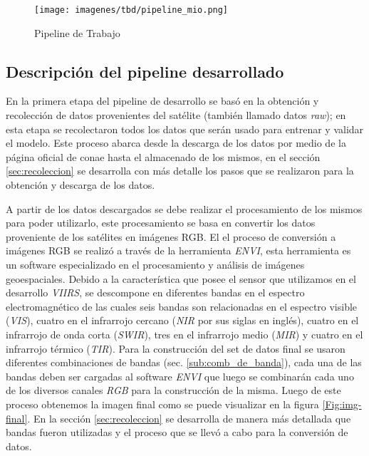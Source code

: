 \begin{figure}[H] \centering
  \texttt{[image: imagenes/tbd/pipeline\_mio.png]}
  \caption{Pipeline de Trabajo}\label{Fig:pipeline-mio}
\end{figure}

\newpage
\subsection*{Descripción del pipeline desarrollado}\label{sub:desc-pipeline}

En la primera etapa del pipeline de desarrollo se basó en la obtención y recolección de datos provenientes del satélite (también llamado datos \textit{raw}); en esta etapa se recolectaron todos los datos que serán usado para entrenar y validar el modelo. Este proceso abarca desde la descarga de los datos por medio de la página oficial de \ac{conae} hasta el almacenado de los mismos, en el sección \ref{sec:recoleccion} se desarrolla con más detalle los pasos que se realizaron para la obtención y descarga de los datos.

A partir de los datos descargados  se debe realizar el procesamiento de los mismos para poder utilizarlo, este procesamiento se basa en convertir los datos proveniente de los satélites en imágenes RGB. El el proceso de conversión a imágenes RGB se realizó a través de la herramienta \textit{ENVI}, esta herramienta es un software  especializado en el procesamiento y análisis de imágenes  geoespaciales. Debido a la característica que posee el sensor que utilizamos en el desarrollo \textit{VIIRS}, se descompone en diferentes bandas en el espectro electromagnético de las cuales seis bandas son relacionadas en el espectro visible (\textit{VIS}), cuatro en el infrarrojo cercano (\textit{NIR} por sus siglas en inglés), cuatro en el infrarrojo de onda corta (\textit{SWIR}), tres en el infrarrojo medio (\textit{MIR}) y cuatro en el infrarrojo térmico (\textit{TIR}). Para la construcción del set de datos final se usaron diferentes combinaciones de bandas (sec. \ref{sub:comb_de_banda}), cada una de las bandas deben ser cargadas al software \textit{ENVI} que luego se combinarán cada uno de los diversos canales \textit{RGB} para la construcción de la misma. Luego de este proceso obtenemos la imagen final como se puede visualizar en la figura \ref{Fig:img-final}. En la sección \ref{sec:recoleccion} se desarrolla de manera más detallada que bandas fueron utilizadas y el proceso que se llevó a cabo para la conversión de datos.

